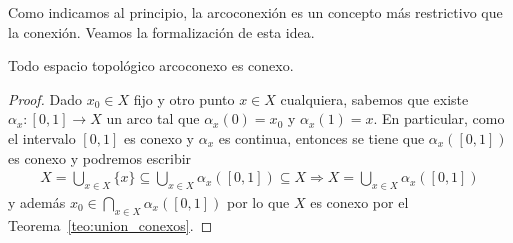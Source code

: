Como indicamos al principio, la arcoconexión es un concepto más restrictivo que la conexión. Veamos la formalización de esta idea.
\begin{teo}
    Todo espacio topológico arcoconexo es conexo.
    \begin{proof}
        Dado $x_0\in X$ fijo y otro punto $x\in X$ cualquiera, sabemos que existe $\alpha_x:[0,1]\to X$ un arco tal que $\alpha_x(0)=x_0$ y $\alpha_x(1)=x$. En particular, como el intervalo $[0,1]$ es conexo y $\alpha_x$ es continua, entonces se tiene que $\alpha_x([0,1])$ es conexo y podremos escribir 
        \begin{gather*}
            X=\bigcup\limits_{x\in X}\{x\}\subseteq \bigcup\limits_{x\in X} \alpha_x ([0,1])\subseteq X \Rightarrow X = \bigcup\limits_{x\in X}\alpha_x([0,1])
        \end{gather*}
        y además $x_0 \in \bigcap\limits_{x\in X}\alpha_x([0,1])$ por lo que $X$ es conexo por el Teorema~\ref{teo:union_conexos}.
    \end{proof}
\end{teo}

